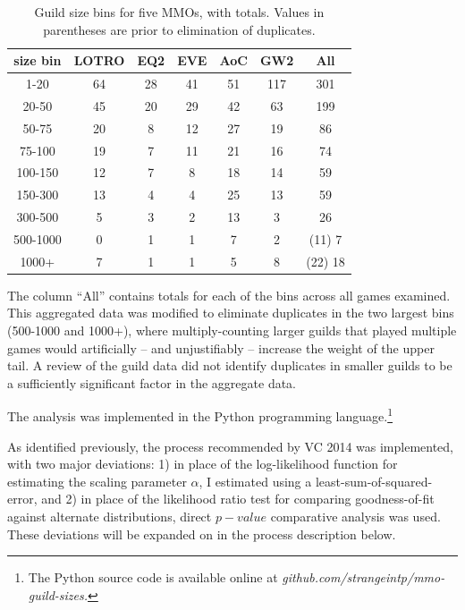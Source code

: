 \documentclass[pdftex,12pt]{llncs}
\begin{document}
\begin{table}
	\centering	
	\caption{Guild size bins for five MMOs, with totals.  Values in parentheses are prior to elimination of duplicates.}
	\begin{tabular}{|c|c|c|c|c|c|c|}
		\hline 
		size bin & LOTRO & EQ2 & EVE & AoC & GW2 & All \\ 
		\hline 
		1-20 & 64 & 28 & 41 & 51 & 117 & 301 \\ 
		\hline 
		20-50 & 45 & 20 & 29 & 42 & 63 & 199 \\ 
		\hline 
		50-75 & 20 & 8 & 12 & 27 & 19 & 86 \\ 
		\hline 
		75-100 & 19 & 7 & 11 & 21 & 16 & 74 \\ 
		\hline 
		100-150 & 12 & 7 & 8 & 18 & 14 & 59 \\ 
		\hline 
		150-300 & 13 & 4 & 4 & 25 & 13 & 59 \\ 
		\hline 
		300-500 & 5 & 3 & 2 & 13 & 3 & 26 \\ 
		\hline 
		500-1000 & 0 & 1 & 1 & 7 & 2 & (11) 7 \\ 
		\hline 
		1000+ & 7 & 1 & 1 & 5 & 8 & (22) 18 \\ 
		\hline 
	\end{tabular}
	\label{tab:mmoguildsizes}
\end{table}

The column “All” contains totals for each of the bins across all games examined.  This aggregated data was modified to eliminate duplicates in the two largest bins (500-1000 and 1000+), where multiply-counting larger guilds that played multiple games would artificially – and unjustifiably – increase the weight of the upper tail.
A review of the guild data did not identify duplicates in smaller guilds to be a sufficiently significant factor in the aggregate data.

The analysis was implemented in the Python programming language.\footnote{The Python source code is available online at \textit{github.com/strangeintp/mmo-guild-sizes.}}

As identified previously, the process recommended by VC 2014 was implemented, with two major deviations:  1) in place of the log-likelihood function for estimating the scaling parameter $\alpha$, I estimated using a least-sum-of-squared-error, and 2) in place of the likelihood ratio test for comparing goodness-of-fit against alternate distributions, direct $p-value$ comparative analysis was used.
These deviations will be expanded on in the process description below.
\end{document}
